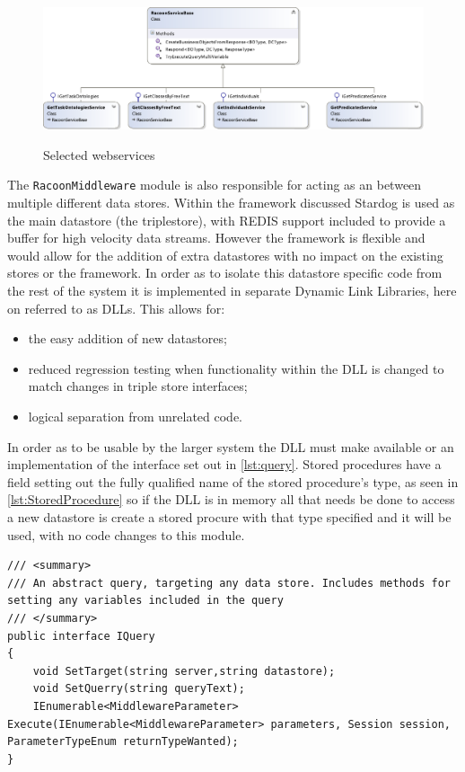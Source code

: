  \begin{figure}
\myfloatalign
{\includegraphics[width=\paperwidth]{gfx/RacoonServices}} 
\caption{Selected webservices}
\label{fig:services}
\end{figure}

The \texttt{RacoonMiddleware} module is also responsible for acting as an  between multiple different data stores. Within the framework discussed Stardog is used as the main datastore (the triplestore), with REDIS support included to provide a buffer for high velocity data streams. However the framework is flexible and would allow for the addition of extra datastores with no impact on the existing stores or the framework. In order as to isolate this datastore specific code from the rest of the system it is implemented in separate Dynamic Link Libraries, here on referred to as DLLs. This allows for:
\begin{itemize}
\item the easy addition of new datastores;
\item reduced regression testing when functionality within the DLL is changed to match changes in triple store interfaces;
\item logical separation from unrelated code. 
\end{itemize}
In order as to be usable by the larger system the DLL must make available or  an implementation of the interface set out in \autoref{lst:query}. Stored procedures have a field setting out the fully qualified name of the stored procedure's type, as seen in \autoref{lst:StoredProcedure} so if the DLL is in memory all that needs be done to access a new datastore is create a stored procure with that type specified and it will be used, with no code changes to this module. 


\vfill
\begin{lstlisting}[language={[Sharp]C},frame=tb,caption={The IQuery interface, which must be implemented by all executable queries},label=lst:query]
/// <summary>
/// An abstract query, targeting any data store. Includes methods for setting any variables included in the query
/// </summary>
public interface IQuery
{
    void SetTarget(string server,string datastore);
    void SetQuerry(string queryText);
    IEnumerable<MiddlewareParameter> Execute(IEnumerable<MiddlewareParameter> parameters, Session session, ParameterTypeEnum returnTypeWanted);      
}
\end{lstlisting}

